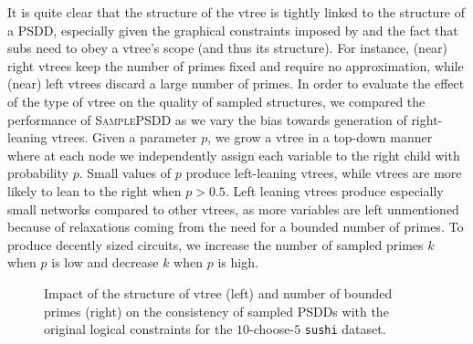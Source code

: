 It is quite clear that the structure of the vtree is tightly linked to the structure of a PSDD,
especially given the graphical constraints imposed by  and the fact that subs
need to obey a vtree's scope (and thus its structure). For instance, (near) right vtrees keep the
number of primes fixed and require no approximation, while (near) left vtrees discard a large
number of primes. In order to evaluate the effect of the type of vtree on the quality of sampled
structures, we compared the performance of \textsc{SamplePSDD} as we vary the bias towards
generation of right-leaning vtrees. Given a parameter $p$, we grow a vtree in a top-down manner
where at each node we independently assign each variable to the right child with probability $p$.
Small values of $p$ produce left-leaning vtrees, while vtrees are more likely to lean to the
right when $p>0.5$. Left leaning vtrees produce especially small networks compared to other vtrees,
as more variables are left unmentioned because of relaxations coming from the need for a bounded
number of primes. To produce decently sized circuits, we increase the number of sampled primes $k$
when $p$ is low and decrease $k$ when $p$ is high.

\begin{figure}[t]
  \begin{subfigure}{0.495\textwidth}
    \caption{}
  \end{subfigure}
  \begin{subfigure}{0.495\textwidth}
    \caption{}
  \end{subfigure}
  \caption{Impact of the structure of vtree (left) and number of bounded primes (right) on the
    consistency of sampled PSDDs with the original logical constraints for the $10$-choose-$5$
    \texttt{sushi} dataset.}
  \label{fig:imp-comp}
\end{figure}

